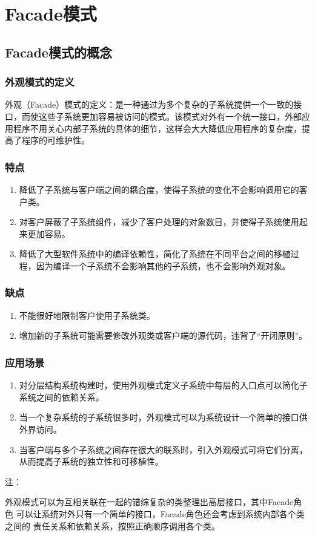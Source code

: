 \chapter{Facade模式}
\section{Facade模式的概念}
\subsection{外观模式的定义}
外观（Facade）模式的定义：是一种通过为多个复杂的子系统提供一个一致的接口，而使这些子系统更加容易被访问的模式。该模式对外有一个统一接口，外部应用程序不用关心内部子系统的具体的细节，这样会大大降低应用程序的复杂度，提高了程序的可维护性。
\subsection{特点}
\begin{enumerate}
	\item 降低了子系统与客户端之间的耦合度，使得子系统的变化不会影响调用它的客户类。
	\item 对客户屏蔽了子系统组件，减少了客户处理的对象数目，并使得子系统使用起来更加容易。
	\item 降低了大型软件系统中的编译依赖性，简化了系统在不同平台之间的移植过程，因为编译一个子系统不会影响其他的子系统，也不会影响外观对象。
\end{enumerate}
\subsection{缺点}
\begin{enumerate}
	\item 不能很好地限制客户使用子系统类。
	\item 增加新的子系统可能需要修改外观类或客户端的源代码，违背了“开闭原则”。
\end{enumerate}
\subsection{应用场景}
\begin{enumerate}
	\item 对分层结构系统构建时，使用外观模式定义子系统中每层的入口点可以简化子系统之间的依赖关系。
	\item 当一个复杂系统的子系统很多时，外观模式可以为系统设计一个简单的接口供外界访问。
	\item 当客户端与多个子系统之间存在很大的联系时，引入外观模式可将它们分离，从而提高子系统的独立性和可移植性。
\end{enumerate}
注：
\par 外观模式可以为互相关联在一起的错综复杂的类整理出高层接口，其中Facade角色
可以让系统对外只有一个简单的接口，Facade角色还会考虑到系统内部各个类之间的
责任关系和依赖关系，按照正确顺序调用各个类。
